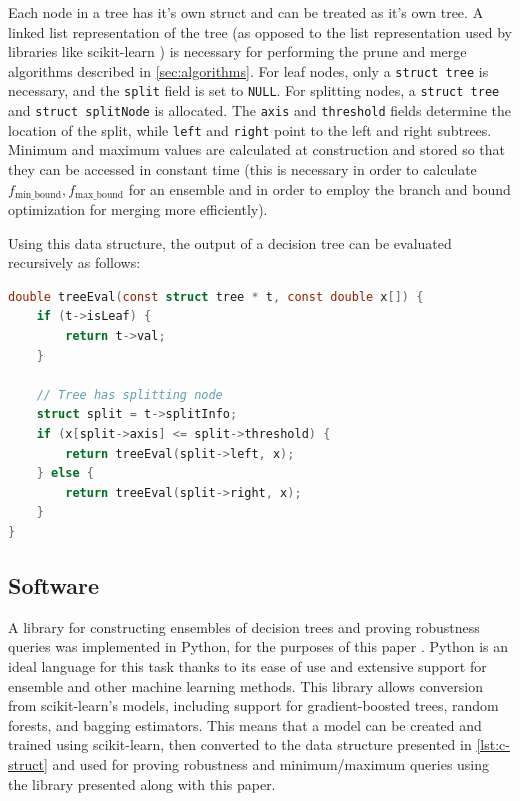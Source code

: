 \documentclass[pageno]{jpaper}
\newcommand{\fminb}{f_{\textrm{min\_bound}}}
\newcommand{\fmaxb}{f_{\textrm{max\_bound}}}
\begin{document}
\begin{doublespacing}
Each node in a tree has it's own struct and can be treated as it's own tree. A linked list representation of the tree (as opposed to the list representation used by libraries like scikit-learn \cite{sklearn}) is necessary for performing the prune and merge algorithms described in \autoref{sec:algorithms}. For leaf nodes, only a \verb|struct tree| is necessary, and the \verb|split| field is set to \verb|NULL|. For splitting nodes, a \verb|struct tree| and \verb|struct splitNode| is allocated. The \verb|axis| and \verb|threshold| fields determine the location of the split, while \verb|left| and \verb|right| point to the left and right subtrees. Minimum and maximum values are calculated at construction and stored so that they can be accessed in constant time (this is necessary in order to calculate $\fminb, \fmaxb$ for an ensemble and in order to employ the branch and bound optimization for merging more efficiently).

Using this data structure, the output of a decision tree can be evaluated recursively as follows:

{\singlespacing
\begin{lstlisting}[language=C, caption=decision tree evaluations]
double treeEval(const struct tree * t, const double x[]) {
    if (t->isLeaf) {
        return t->val;
    }

    // Tree has splitting node
    struct split = t->splitInfo;
    if (x[split->axis] <= split->threshold) {
        return treeEval(split->left, x);
    } else {
        return treeEval(split->right, x);
    }
}
\end{lstlisting}
}

\subsection{Software}
A library for constructing ensembles of decision trees and proving robustness queries was implemented in Python, for the purposes of this paper \cite{github}. Python is an ideal language for this task thanks to its ease of use and extensive support for ensemble and other machine learning methods. This library allows conversion from scikit-learn's models, including support for gradient-boosted trees, random forests, and bagging estimators. This means that a model can be created and trained using scikit-learn, then converted to the data structure presented in \autoref{lst:c-struct} and used for proving robustness and minimum/maximum queries using the library presented along with this paper.


\end{doublespacing}
\end{document}
